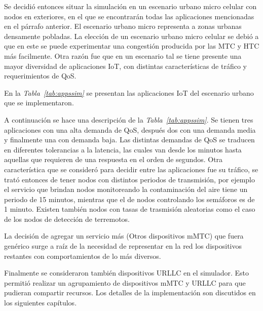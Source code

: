 Se decidió entonces situar la simulación en un escenario urbano micro celular con nodos en exteriores, en el que se encontrarán todas las aplicaciones mencionadas en el párrafo anterior. El escenario urbano micro representa a zonas urbanas densamente pobladas. La elección de un escenario urbano micro celular se debió a que en este se puede experimentar una congestión producida por las  MTC y HTC más facilmente. Otra razón fue que en un escenario tal se tiene presente una mayor diversidad de aplicaciones IoT, con distintas características de tráfico y requerimientos de QoS.\newline

En la \textit{Tabla~\ref{tab:appssim}} se presentan las aplicaciones IoT del escenario urbano que se implementaron.\newline

A continuación se hace una descripción de la \textit{Tabla~\ref{tab:appssim}}. Se tienen tres aplicaciones con una alta demanda de QoS, después dos con una demanda media y finalmente una con demanda baja. Las distintas demandas de QoS se traducen en diferentes tolerancias a la latencia, las cuales van desde los minutos hasta aquellas que requieren de una respuesta en el orden de segundos. Otra característica que se consideró para decidir entre las aplicaciones fue su tráfico, se trató entonces de tener nodos con distintos periodos de transmisión, por ejemplo el servicio que brindan nodos monitoreando la contaminación del aire tiene un periodo de 15 minutos, mientras que el de nodos controlando los semáforos es de 1 minuto. Existen también nodos con tasas de trasmisión aleatorias como el caso de los nodos de detección de terremotos. \newline

La decisión de agregar un servicio más (Otros dispositivos mMTC) que fuera genérico surge a raíz de la necesidad de representar en la red los dispositivos restantes con comportamientos de lo más diversos.\newline

Finalmente se consideraron también dispositivos URLLC en el simulador. Esto permitió realizar un agrupamiento de dispositivos mMTC y URLLC para que pudieran compartir recursos. Los detalles de la implementación son discutidos en los siguientes capítulos.

